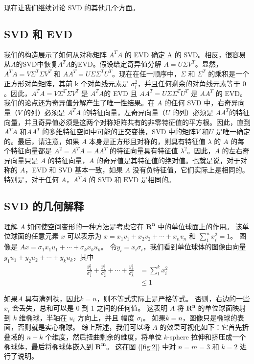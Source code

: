 \documentclass[11pt,a4paper,twoside]{article}
\begin{document}
\begin{CJK}{UTF8}{gbsn}
现在让我们继续讨论 SVD 的其他几个方面。

\subsection{SVD 和 EVD}
我们的构造展示了如何从对称矩阵 $A^{T} A$ 的 EVD 确定 A 的 SVD。相反，很容易从$A$的SVD中恢复$A^{T}A$的EVD。假设给定奇异值分解 $A=U \Sigma V^{T}$。显然，$A^{T} A=V \Sigma^{T} \Sigma V^{T}$ 和 $A A^{T}=U \Sigma \Sigma^{T} U^{T}$。现在在任一顺序中，$\Sigma$ 和 $\Sigma^{T}$ 的乘积是一个正方形对角矩阵，其前 k 个对角线元素是 $\sigma_{i}^{2}$，并且任何剩余的对角线元素等于 0 。因此，$A^{T} A=V \Sigma^{T} \Sigma V^{T}$ 是 $A^{T} A$的 EVD 且 $A A^{T}=U \Sigma \Sigma^{T} U^{T}$ 是 $A A^{T}$ 的 EVD。我们的论点还为奇异值分解产生了唯一性结果。在 $A$ 的任何 SVD 中，右奇异向量（$V$ 的列）必须是 $A^{T} A$ 的特征向量，左奇异向量（$U$ 的列）必须是 $ A A^{T}$的特征向量，并且奇异值必须是这两个对称矩阵共有的非零特征值的平方根。因此，直到$A^{T} A$ 和$A A^{T}$ 的多维特征空间中可能的正交变换，SVD 中的矩阵$V$ 和$U$ 是唯一确定的。最后，请注意，如果 $A$ 本身是正方形且对称的，则具有特征值 $\lambda$ 的 $A$ 的每个特征向量都是 $A^{2}=A^{T} A=A A^{T}$ 的特征向量具有特征值 $\lambda^{2}$。因此，$A$ 的左右奇异向量只是 $A$ 的特征向量，$A$ 的奇异值是其特征值的绝对值。也就是说，对于对称的 $A$，EVD 和 SVD 基本一致，如果 $A$ 没有负特征值，它们实际上是相同的。特别是，对于任何 $A$，$A^{T} A$ 的 SVD 和 $\mathrm{EVD}$ 是相同的。

\subsection{SVD 的几何解释}
理解 $A$ 如何使空间变形的一种方法是考虑它在 $\mathbf{R}^{\mathbf{n}}$ 中的单位球面上的作用。 该单位球面的任意元素 $x$ 可以表示为 $x=x_{1} v_{1}+x_{2} v_{2}+\cdots+x_{n} v_{n}$ 和 $\sum_{1}^{n} x_{i}^{2}=1$。 图像是 $A x=\sigma_{1} x_{1} u_{1}+\cdots+\sigma_{k} x_{k} u_{k}$。 令$y_{i}=x_{i} \sigma_{i}$，我们看到单位球体的图像由向量$y_{1} u_{1}+y_{2} u_{2}+\cdots+y_{k} u_{k}$，其中
$$
\begin{aligned}
\frac{y_{1}^{2}}{\sigma_{1}^{2}}+\frac{y_{2}^{2}}{\sigma_{2}^{2}}+\cdots+\frac{y_{k}^{2}}{\sigma_{k}^{2}} &=\sum_{1}^{k} x_{i}^{2} \\
& \leq 1
\end{aligned}
$$

如果$A$ 具有满列秩，因此$k=n$，则不等式实际上是严格等式。 否则，右边的一些 $x_{i}$ 会丢失，总和可以是 0 到 1 之间的任何值。 这表明 $A$ 将 $\mathbf{R}^{\mathbf{n}}$ 的单位球面映射到 $k$ 维椭球，半轴在 $u_{i}$ 方向上，并且 幅度 $\sigma_{i}$。 如果$k=n$，图像只是椭球的表面，否则就是实心椭球。 综上所述，我们可以将 $A$ 的效果可视化如下：它首先折叠域的 $n-k$ 个维度，然后扭曲剩余的维度，将单位 $k$-sphere 拉伸和挤压成一个椭球体，最后将椭球体嵌入到 $\mathbf{R}^{\mathbf{m}}$。 这在图 (\ref{fig:2}) 中对 $n=m=3$ 和 $k=2$ 进行了说明。


\end{CJK}
\end{document}

